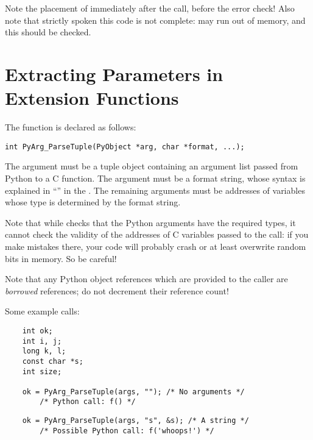 Note the placement of  immediately after the
call, before the error check!  Also note that strictly spoken this
code is not complete:  may run out of
memory, and this should be checked.


\section{Extracting Parameters in Extension Functions
         \label{parseTuple}}


The  function is declared as follows:

\begin{verbatim}
int PyArg_ParseTuple(PyObject *arg, char *format, ...);
\end{verbatim}

The  argument must be a tuple object containing an argument
list passed from Python to a C function.  The  argument
must be a format string, whose syntax is explained in
``'' in the
.  The
remaining arguments must be addresses of variables whose type is
determined by the format string.

Note that while  checks that the Python
arguments have the required types, it cannot check the validity of the
addresses of C variables passed to the call: if you make mistakes
there, your code will probably crash or at least overwrite random bits
in memory.  So be careful!

Note that any Python object references which are provided to the
caller are \emph{borrowed} references; do not decrement their
reference count!

Some example calls:

\begin{verbatim}
    int ok;
    int i, j;
    long k, l;
    const char *s;
    int size;

    ok = PyArg_ParseTuple(args, ""); /* No arguments */
        /* Python call: f() */
\end{verbatim}

\begin{verbatim}
    ok = PyArg_ParseTuple(args, "s", &s); /* A string */
        /* Possible Python call: f('whoops!') */
\end{verbatim}

